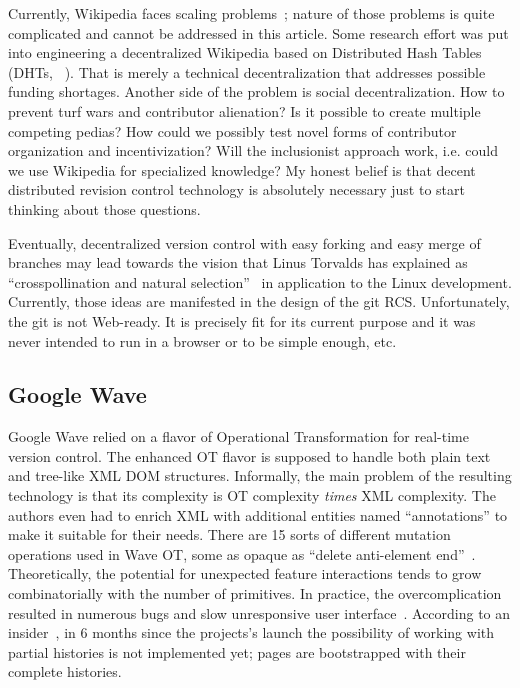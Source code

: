 \documentclass{sig-alternate}
\begin{document}
Currently, Wikipedia faces scaling problems~\cite{wp-decay,no-singularity}; nature of those problems is quite complicated and cannot be addressed in this article.
Some research effort was put into engineering a decentralized Wikipedia based on Distributed Hash Tables (DHTs, ~\cite{urdaneta}).
That is merely a technical decentralization that addresses possible funding shortages.
Another side of the problem is social decentralization.
How to prevent turf wars and contributor alienation?
Is it possible to create multiple competing pedias?
How could we possibly test novel forms of contributor organization and incentivization?
Will the inclusionist approach work, i.e. could we use Wikipedia for specialized knowledge?
My honest belief is that decent distributed revision control technology is absolutely necessary just to start thinking about those questions.

Eventually, decentralized version control with easy forking and easy merge of branches may lead towards the vision that Linus Torvalds has explained as ``crosspollination and natural selection''~\cite{linus-pollinates} in application to the Linux development.
Currently, those ideas are manifested in the design of the git RCS.
Unfortunately, the git is not Web-ready.
It is precisely fit for its current purpose and it was never intended to run in a browser or to be simple enough, etc.


\subsection{Google Wave}  \label{sec:waveot}

Google Wave relied on a flavor of Operational Transformation for
real-time version control. The enhanced OT flavor is supposed to
handle both plain text and tree-like XML DOM structures.
Informally, the main problem of the resulting technology is that
its complexity is OT complexity \emph{times} XML complexity. 
The authors even had to enrich XML with additional entities 
named ``annotations'' to make it suitable for their needs.
There are 15 sorts of different mutation operations used in Wave
OT, some as opaque as ``delete anti-element end''~\cite{waveot}.
Theoretically, the potential for unexpected feature interactions
tends to grow combinatorially with the number of primitives.
In practice, the overcomplication resulted in numerous bugs and
slow unresponsive user interface~\cite{own-experience}.
According to an insider~\cite{gerasimov}, in 6 months since the
projects's launch the possibility of working with partial
histories is not  implemented yet; pages are bootstrapped with
their complete histories. 
\end{document}
